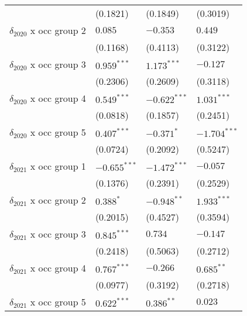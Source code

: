 \begin{tabular}{llll}
                                       &           (0.1821) &           (0.1849) &           (0.3019) \\
$\delta_{2020}$ x occ group 2          &            $0.085$ &           $-0.353$ &            $0.449$ \\
                                       &           (0.1168) &           (0.4113) &           (0.3122) \\
$\delta_{2020}$ x occ group 3          &      $0.959^{***}$ &      $1.173^{***}$ &           $-0.127$ \\
                                       &           (0.2306) &           (0.2609) &           (0.3118) \\
$\delta_{2020}$ x occ group 4          &      $0.549^{***}$ &     $-0.622^{***}$ &      $1.031^{***}$ \\
                                       &           (0.0818) &           (0.1857) &           (0.2451) \\
$\delta_{2020}$ x occ group 5          &      $0.407^{***}$ &         $-0.371^*$ &     $-1.704^{***}$ \\
                                       &           (0.0724) &           (0.2092) &           (0.5247) \\
$\delta_{2021}$ x occ group 1          &     $-0.655^{***}$ &     $-1.472^{***}$ &           $-0.057$ \\
                                       &           (0.1376) &           (0.2391) &           (0.2529) \\
$\delta_{2021}$ x occ group 2          &          $0.388^*$ &      $-0.948^{**}$ &      $1.933^{***}$ \\
                                       &           (0.2015) &           (0.4527) &           (0.3594) \\
$\delta_{2021}$ x occ group 3          &      $0.845^{***}$ &            $0.734$ &           $-0.147$ \\
                                       &           (0.2418) &           (0.5063) &           (0.2712) \\
$\delta_{2021}$ x occ group 4          &      $0.767^{***}$ &           $-0.266$ &       $0.685^{**}$ \\
                                       &           (0.0977) &           (0.3192) &           (0.2718) \\
$\delta_{2021}$ x occ group 5          &      $0.622^{***}$ &       $0.386^{**}$ &            $0.023$ \\

\end{tabular}
